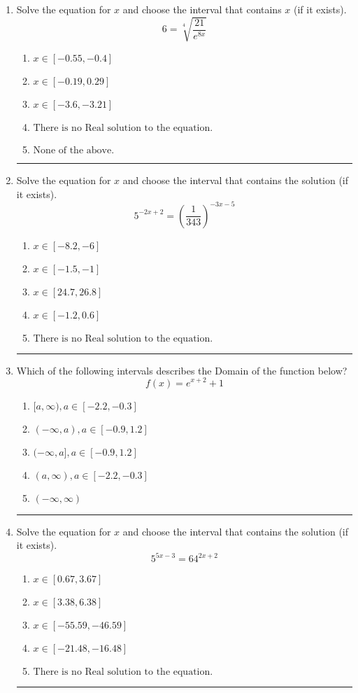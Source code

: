 \documentclass[14pt]{extbook}
\newcommand{\litem}[1]{\item#1\hspace*{-1cm}\rule{\textwidth}{0.4pt}}
\begin{document}
\begin{enumerate}
\litem{
 Solve the equation for $x$ and choose the interval that contains $x$ (if it exists).\[  6 = \sqrt[4]{\frac{21}{e^{8x}}} \]\begin{enumerate}[label=\Alph*.]
\item \( x \in [-0.55, -0.4] \)
\item \( x \in [-0.19, 0.29] \)
\item \( x \in [-3.6, -3.21] \)
\item \( \text{There is no Real solution to the equation.} \)
\item \( \text{None of the above.} \)

\end{enumerate} }
\litem{
Solve the equation for $x$ and choose the interval that contains the solution (if it exists).\[ 5^{-2x+2} = \left(\frac{1}{343}\right)^{-3x-5} \]\begin{enumerate}[label=\Alph*.]
\item \( x \in [-8.2, -6] \)
\item \( x \in [-1.5, -1] \)
\item \( x \in [24.7, 26.8] \)
\item \( x \in [-1.2, 0.6] \)
\item \( \text{There is no Real solution to the equation.} \)

\end{enumerate} }
\litem{
Which of the following intervals describes the Domain of the function below?\[ f(x) = e^{x+2}+1 \]\begin{enumerate}[label=\Alph*.]
\item \( [a, \infty), a \in [-2.2, -0.3] \)
\item \( (-\infty, a), a \in [-0.9, 1.2] \)
\item \( (-\infty, a], a \in [-0.9, 1.2] \)
\item \( (a, \infty), a \in [-2.2, -0.3] \)
\item \( (-\infty, \infty) \)

\end{enumerate} }
\litem{
Solve the equation for $x$ and choose the interval that contains the solution (if it exists).\[ 5^{5x-3} = 64^{2x+2} \]\begin{enumerate}[label=\Alph*.]
\item \( x \in [0.67, 3.67] \)
\item \( x \in [3.38, 6.38] \)
\item \( x \in [-55.59, -46.59] \)
\item \( x \in [-21.48, -16.48] \)
\item \( \text{There is no Real solution to the equation.} \)


\end{enumerate}}
\end{enumerate}
\end{document}
